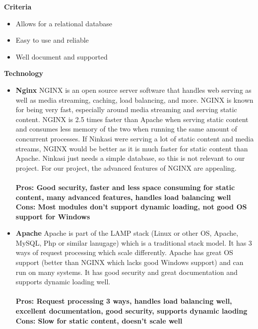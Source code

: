 \documentclass[draftclsnofoot,onecolumn,letterpaper,10pt]{IEEEtran}
\begin{document}
	\textbf{Criteria}
		\begin{itemize}
			\item Allows for a relational database
			\item Easy to use and reliable
			\item Well document and supported
		\end{itemize}

	\textbf{Technology}
		\begin{itemize}
			\item{\textbf{Nginx}}
				NGINX is an open source server software that handles web serving as well as media streaming, caching, load balancing, and more\cite{NGINX}.
				NGINX is known for being very fast, especially around media streaming and serving static content\cite{NGINX}.
				NGINX is 2.5 times faster than Apache when serving static content and consumes less memory of the two when running the same amount of concurrent processes\cite{HostingAd}.
				If Ninkasi were serving a lot of static content and media streams, NGINX would be better as it is much faster for static content than Apache.
				Ninkasi just needs a simple database, so this is not relevant to our project.
				For our project, the advanced features of NGINX are appealing.
				\\ \\
				\textbf{Pros: Good security, faster and less space consuming for static content, many advanced features, handles load balancing well}
				\\
				\textbf{Cons: Most modules don't support dynamic loading, not good OS support for Windows}


			\item{\textbf{Apache}}
				Apache is part of the LAMP stack (Linux or other OS, Apache, MySQL, Php or similar lanugage) which is a traditional stack model\cite{UpWork}.
				It has 3 ways of request processing which scale differently.
				Apache has great OS support (better than NGINX which lacks good Windows support) and can run on many systems\cite{HostingAd}.
				It has good security and great documentation and supports dynamic loading well\cite{HostingAd}.
				\\ \\
				\textbf{Pros: Request processing 3 ways, handles load balancing well, excellent documentation, good security, supports dynamic laoding}
				\\
				\textbf{Cons: Slow for static content, doesn't scale well}



\end{itemize}
\end{document}
